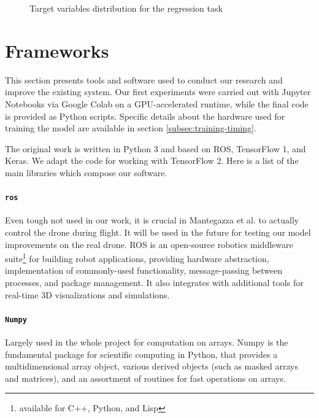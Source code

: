 \begin{figure}[!h]
\begin{center}
\begin{subfigure}[h]{0.24\textwidth}
		\end{subfigure}
	\end{center}
	\vspace{-0.5cm}
	\caption[Target variables distribution for the regression task]{Target variables distribution for the regression task}
	\label{fig:frontalnet-dataset-distribution-regr}
\end{figure}




\section{Frameworks}
\label{sec:software}

This section presents tools and software used to conduct our research and improve the existing system. Our first experiments were carried out with Jupyter Notebooks via Google Colab on a GPU-accelerated runtime, while the final code is provided as Python scripts. Specific details about the hardware used for training the model are available in section \ref{subsec:training-timing}. 

The original work is written in Python 3 and based on ROS, TensorFlow 1, and Keras. We adapt the code for working with TensorFlow 2. Here is a list of the main libraries which compose our software.

\paragraph*{\texttt{\gls{ros}}}
Even tough not used in our work, it is crucial in Mantegazza et al. \cite{mantegazza2019visionbased} to actually control the drone during flight. It will be used in the future for testing our model improvements on the real drone. ROS \cite{ROS} is an open-source robotics middleware suite\footnote{available for C++, Python, and Lisp} for building robot applications, providing hardware abstraction, implementation of commonly-used functionality, message-passing between processes, and package management. It also integrates with additional tools for real-time 3D visualizations and simulations.

\paragraph*{\texttt{Numpy}}
Largely used in the whole project for computation on arrays. Numpy is the fundamental package for scientific computing in Python, that provides a multidimensional array object, various derived objects (such as masked arrays and matrices), and an assortment of routines for fast operations on arrays. 

